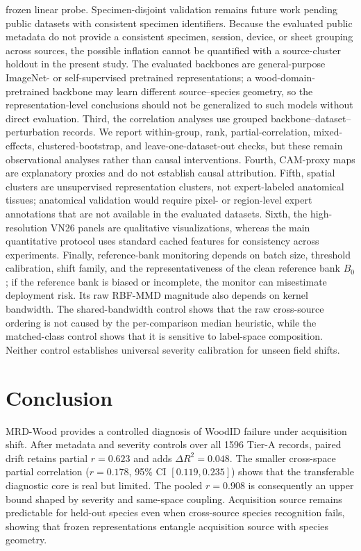 \documentclass[a4paper,fleqn]{els-cas-templates/cas-sc}
\begin{document}
frozen linear probe. Specimen-disjoint validation remains future work
pending public datasets with consistent specimen identifiers. Because the
evaluated public metadata do not provide a consistent specimen, session, device,
or sheet grouping across sources, the possible inflation cannot be quantified
with a source-cluster holdout in the present study. The evaluated backbones are
general-purpose ImageNet- or self-supervised pretrained representations; a
wood-domain-pretrained backbone may learn different source--species geometry,
so the representation-level conclusions should not be generalized to such
models without direct evaluation. Third, the
correlation analyses use grouped backbone--dataset--perturbation records. We
report within-group, rank, partial-correlation, mixed-effects,
clustered-bootstrap, and leave-one-dataset-out checks, but these remain
observational analyses rather than causal interventions. Fourth, CAM-proxy maps
are explanatory proxies and do not establish causal attribution. Fifth, spatial
clusters are unsupervised representation clusters, not expert-labeled anatomical
tissues; anatomical validation would require pixel- or region-level expert
annotations that are not available in the evaluated datasets. Sixth, the
high-resolution VN26 panels are qualitative visualizations, whereas the main
quantitative protocol uses standard cached features for consistency across
experiments. Finally, reference-bank monitoring depends on batch size, threshold
calibration, shift family, and the representativeness of the clean reference bank
$B_0$; if the reference bank is biased or incomplete, the monitor can misestimate
deployment risk. Its raw RBF-MMD magnitude also depends on kernel bandwidth.
The shared-bandwidth control shows that the raw cross-source ordering is not
caused by the per-comparison median heuristic, while the matched-class control
shows that it is sensitive to label-space composition. Neither control
establishes universal severity calibration for unseen field shifts.

\section{Conclusion}

MRD-Wood provides a controlled diagnosis of WoodID failure under acquisition
shift. After metadata and severity controls over all 1596 Tier-A records,
paired drift retains partial $r=0.623$ and adds $\Delta R^2=0.048$. The smaller cross-space
partial correlation ($r=0.178$, 95\% CI $[0.119,0.235]$) shows that the transferable diagnostic core is
real but limited. The pooled $r=0.908$ is consequently an upper bound shaped by
severity and same-space coupling. Acquisition source remains predictable for
held-out species even when cross-source species recognition fails, showing that
frozen representations entangle acquisition source with species geometry.
\end{document}

